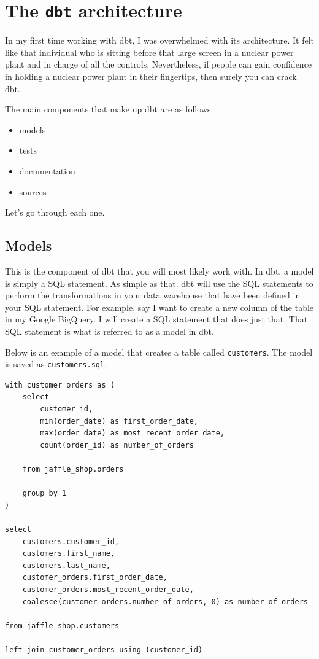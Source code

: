 \documentclass[
]{book}
\begin{document}
\hypertarget{the-dbt-architecture}{%
\chapter{\texorpdfstring{The \texttt{dbt} architecture}{The dbt architecture}}\label{the-dbt-architecture}}

In my first time working with dbt, I was overwhelmed with its architecture. It felt like that individual who is sitting before that large screen in a nuclear power plant and in charge of all the controls. Nevertheless, if people can gain confidence in holding a nuclear power plant in their fingertips, then surely you can crack dbt.

The main components that make up dbt are as follows:

\begin{itemize}
\item
  models
\item
  tests
\item
  documentation
\item
  sources
\end{itemize}

Let's go through each one.

\hypertarget{models}{%
\section{Models}\label{models}}

This is the component of dbt that you will most likely work with. In dbt, a model is simply a SQL statement. As simple as that. dbt will use the SQL statements to perform the transformations in your data warehouse that have been defined in your SQL statement. For example, say I want to create a new column of the table in my Google BigQuery. I will create a SQL statement that does just that. That SQL statement is what is referred to as a model in dbt.

Below is an example of a model that creates a table called \texttt{customers}. The model is saved as \texttt{customers.sql}.

\begin{verbatim}
with customer_orders as (
    select
        customer_id,
        min(order_date) as first_order_date,
        max(order_date) as most_recent_order_date,
        count(order_id) as number_of_orders

    from jaffle_shop.orders

    group by 1
)

select
    customers.customer_id,
    customers.first_name,
    customers.last_name,
    customer_orders.first_order_date,
    customer_orders.most_recent_order_date,
    coalesce(customer_orders.number_of_orders, 0) as number_of_orders

from jaffle_shop.customers

left join customer_orders using (customer_id)
\end{verbatim}
\end{document}
